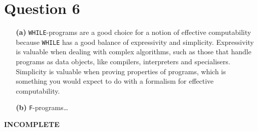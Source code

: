 \documentclass{article}
\begin{document}
\section*{Question 6}
\begin{enumerate}
    \item[\textbf{(a)}] \texttt{WHILE}-programs are a good choice for a notion of effective computability because \texttt{WHILE} has a good balance of expressivity and simplicity. Expressivity is valuable when dealing with complex algorithms, such as those that handle programs as data objects, like compilers, interpreters and specialisers. Simplicity is valuable when proving properties of programs, which is something you would expect to do with a formalism for effective computability.
    \item[\textbf{(b)}] \texttt{F}-programs\dots
\end{enumerate}

\textbf{INCOMPLETE}
\end{document}
